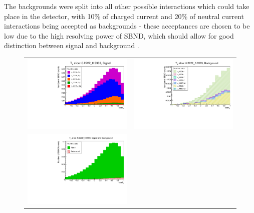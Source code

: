 The backgrounds were split into all other possible interactions which could take place in the detector, with 10\% of charged current and 20\% of neutral current interactions being accepted as backgrounds - these acceptances are chosen to be low due to the high resolving power of SBND, which should allow for good distinction between signal and background \footnotemark.



\begin{figure}[h!]
    \centering
    \begin{tabular}{cc}
        \includegraphics[width=.49\textwidth, trim=0 0 0 1.2cm, clip]{images/Signal_Tmu_slice_02222_03333.pdf}
        &
        \includegraphics[width=.49\textwidth, trim=0 0 0 1.2cm, clip]{images/BG_Tmu_slice_02222_03333.pdf}
        \\
        \includegraphics[width=.49\textwidth, trim=0 0 0 1.2cm, clip]{images/SBG_Tmu_slice_02222_03333.pdf}

\end{tabular}
\end{figure}
